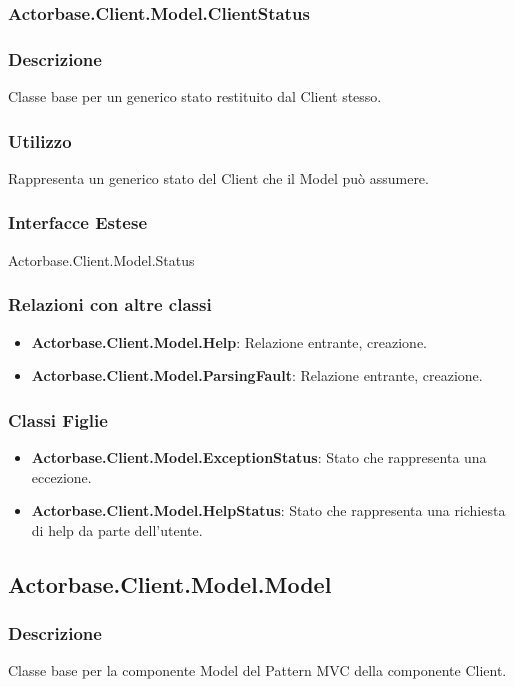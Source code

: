 \documentclass[a4paper]{article}
\begin{document}
			
		\subsubsection{Actorbase.Client.Model.ClientStatus}
			\subsubsection{Descrizione}
				Classe base per un generico stato restituito dal Client stesso.
			\subsubsection{Utilizzo}
				Rappresenta un generico stato del Client che il Model può assumere.
			\subsubsection{Interfacce Estese}
				Actorbase.Client.Model.Status
			\subsubsection{Relazioni con altre classi}
				\begin{itemize}
					\item \textbf{Actorbase.Client.Model.Help}: Relazione entrante, creazione.
					\item \textbf{Actorbase.Client.Model.ParsingFault}: Relazione entrante, creazione.
				\end{itemize}
			\subsubsection{Classi Figlie}
				\begin{itemize}
					\item \textbf{Actorbase.Client.Model.ExceptionStatus}:
						Stato che rappresenta una eccezione.
					\item \textbf{Actorbase.Client.Model.HelpStatus}:
						Stato che rappresenta una richiesta di help da parte dell'utente.
				\end{itemize}
			
		\subsection{Actorbase.Client.Model.Model}
			\subsubsection{Descrizione}
				Classe base per la componente Model del Pattern MVC della componente Client.
\end{document}
